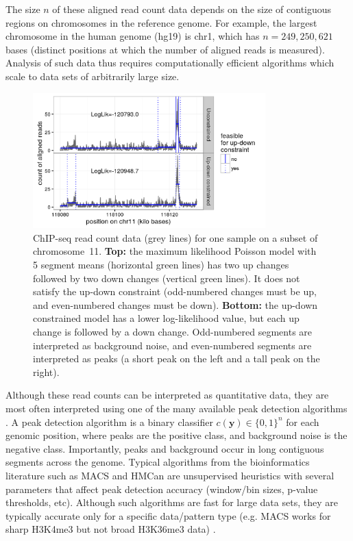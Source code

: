 \documentclass[twoside,11pt]{article}
\begin{document}
The size $n$ of these aligned read count data depends on the size of contiguous regions on chromosomes in the reference genome. For example, the largest
chromosome in the human genome (hg19) is chr1, which has $n=249,250,621$
bases (distinct positions at which the number of aligned reads is
measured). Analysis of such data thus requires computationally
efficient algorithms which scale to data sets of arbitrarily large
size.

\begin{figure}[t!]
  \centering
  \includegraphics[width=0.8\textwidth]{figure-data-models}
  \vskip -0.5cm
  \caption{ChIP-seq read count data (grey lines) for one sample on a
    subset of chromosome~11. \textbf{Top:} the maximum likelihood
    Poisson model with 5 segment means (horizontal green lines) has
    two up changes followed by two down changes (vertical green
    lines). It does not satisfy the up-down constraint (odd-numbered
    changes must be up, and even-numbered changes must be
    down). \textbf{Bottom:} the up-down constrained model has a lower
    log-likelihood value, but each up change is followed by a down
    change. Odd-numbered segments are interpreted as background noise,
    and even-numbered segments are interpreted as peaks (a short peak
    on the left and a tall peak on the right).}
  \label{fig:data-models}
\end{figure}

Although these read counts can be interpreted as quantitative data,
they are most often interpreted using one of the many available peak
detection algorithms \citep{evaluation2010, rye2010manually,
  chip-seq-bench}. A peak detection algorithm is a binary classifier $c(\mathbf y)\in\{0,1\}^n$
for each genomic position, where peaks are the positive class, and
background noise is the negative class. Importantly, peaks and
background occur in long contiguous segments across the
genome. Typical algorithms from the bioinformatics literature such as
MACS \citep{MACS} and HMCan \citep{HMCan} are unsupervised heuristics with several
parameters that affect peak detection accuracy (window/bin sizes,
p-value thresholds, etc). Although such algorithms are fast for large
data sets, they are typically accurate only for a specific data/pattern type (e.g. MACS works for sharp H3K4me3 but not broad H3K36me3 data)
\citep{HOCKING2016-chipseq}.
\end{document}
